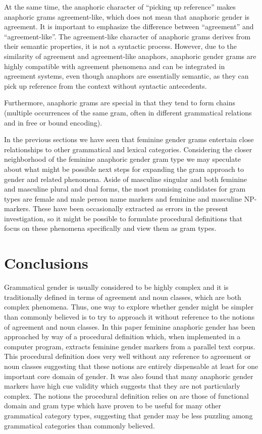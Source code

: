 \documentclass[output=collectionpaper]{langsci/langscibook}
\begin{document}
At the same time, the anaphoric character of “picking up reference” makes anaphoric grams agreement-like, which does not mean that anaphoric gender is agreement. It is important to emphasize the difference between “agreement” and “agreement-like”. The agreement-like character of anaphoric grams derives from their semantic properties, it is not a syntactic process. However, due to the similarity of agreement and agreement-like anaphors, anaphoric gender grams are highly compatible with agreement phenomena and can be integrated in agreement systems, even though anaphors are essentially semantic, as they can pick up reference from the context without syntactic antecedents.

Furthermore, anaphoric grams are special in that they tend to form chains (multiple occurrences of the same gram, often in different grammatical relations and in free or bound encoding).

In the previous sections we have seen that feminine gender grams entertain close relationships to other grammatical and lexical categories. Considering the closer neighborhood of the feminine anaphoric gender gram type we may speculate about what might be possible next steps for expanding the gram approach to gender and related phenomena. Aside of masculine singular and both feminine and masculine plural and dual forms, the most promising candidates for gram types are female and male person name markers and feminine and masculine NP-markers. These have been occasionally extracted as errors in the present investigation, so it might be possible to formulate procedural definitions that focus on these phenomena specifically and view them as gram types.

\section{Conclusions}
\label{sec:BW:7}

Grammatical gender is usually considered to be highly complex and it is traditionally defined in terms of agreement and noun classes, which are both complex phenomena. Thus, one way to explore whether gender might be simpler than commonly believed is to try to approach it without reference to the notions of agreement and noun classes. In this paper feminine anaphoric gender has been approached by way of a procedural definition which, when implemented in a computer program, extracts feminine gender markers from a parallel text corpus. This procedural definition does very well without any reference to agreement or noun classes suggesting that these notions are entirely dispensable at least for one important core domain of gender. It was also found that many anaphoric gender markers have high cue validity which suggests that they are not particularly complex. The notions the procedural definition relies on are those of functional domain and gram type which have proven to be useful for many other grammatical category types, suggesting that gender may be less puzzling among grammatical categories than commonly believed.
\end{document}
